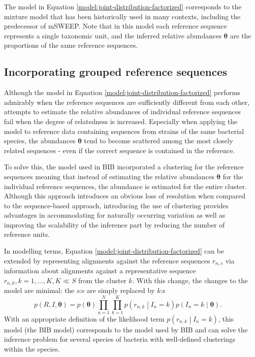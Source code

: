 \documentclass[officiallayout]{tktla}
\begin{document}
The model in Equation \ref{model:joint-distribution-factorized}
corresponds to the mixture model that has been historically used in
many contexts, including the predecessor of mSWEEP. Note that in this
model each reference sequence represents a single taxonomic unit, and
the inferred relative abundances $\boldsymbol\theta$ are the
proportions of the same reference sequences.

\subsection{Incorporating grouped reference sequences}

Although the model in Equation
\ref{model:joint-distribution-factorized} performs admirably when the
reference sequences are sufficiently different from each other,
attempts to estimate the relative abundances of individual reference
sequences fail when the degree of relatedness is increased. Especially
when applying the model to reference data containing sequences from
strains of the same bacterial species, the abundances
$\boldsymbol\theta$ tend to become scattered among the most closely
related sequences - even if the correct sequence is contained in the
reference.

To solve this, the model used in BIB incorporated a clustering for the
reference sequences \textemdash meaning that instead of estimating the
relative abundances $\boldsymbol\theta$ for the individual reference
sequences, the abundance is estimated for the entire cluster. Although
this approach introduces an obvious loss of resolution when compared
to the sequence-based approach, introducing the use of clustering
provides advantages in accommodating for naturally occurring variation
as well as improving the scalability of the inference part by reducing
the number of reference units.

In modelling terms, Equation \ref{model:joint-distribution-factorized}
can be extended by representing alignments against the reference
sequences $r_{n, s}$ via information about alignments against a
representative sequence $r_{n, k}, k = 1, \dots, K, K \ll S$ from the
cluster $k$. With this change, the changes to the model are minimal:
the $s$:s are simply replaced by $k$:s
\begin{equation}
  \label{model:grouped-joint-distribution}
  p\left(R, I, \boldsymbol\theta\right) = p\left(\boldsymbol\theta\right)\prod_{n = 1}^{N} \prod_{k = 1}^{K} p\left(r_{n, k} \middle| I_{n} = k\right) p\left(I_{n} = k \middle| \boldsymbol\theta\right).
\end{equation}
With an appropriate definition of the likelihood term $p\left(r_{n, k}
\middle| I_{n} = k\right)$, this model (the BIB model) corresponds
to the model used by BIB and can solve the inference problem for
several species of bacteria with well-defined clusterings within the
species.
\end{document}
